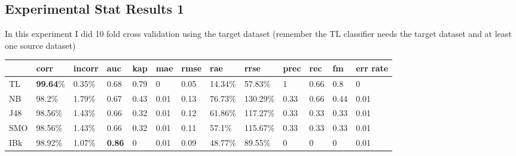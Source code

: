 \documentclass[a4paper,12pt, english]{article}
\begin{document}
\subsection{Experimental Stat Results 1}
In this experiment I did 10 fold cross validation using the target dataset (remember the TL classifier needs the target dataset and at least one source dataset)
\begin{small}
\begin{center}
    \begin{tabular}{ | l | l | l | l | l | l | l | l | l | l | l | l | l |}
    \hline
      & corr & incorr  & auc & kap & mae & rmse & rae & rrse & prec & rec & fm & err rate\\ \hline
      TL  & \textbf{99.64}\% & 0.35\% & 0.68 & 0.79 & 0 & 0.05 & 14.34\% & 57.83\% & 1 & 0.66 & 0.8 & 0\\ \hline
      NB  & 98.2\%  & 1.79\% & 0.67 & 0.43 & 0.01 & 0.13 & 76.73\% & 130.29\% & 0.33 & 0.66 & 0.44 & 0.01\\ \hline
      J48 & 98.56\% & 1.43\% & 0.66 & 0.32 & 0.01 & 0.12 & 61.86\% & 117.27\% & 0.33 & 0.33 & 0.33 & 0.01\\ \hline
      SMO & 98.56\% & 1.43\% & 0.66 & 0.32 & 0.01 & 0.11 & 57.1\% & 115.67\% & 0.33 & 0.33 & 0.33 & 0.01\\ \hline
      IBk & 98.92\% & 1.07\% & \textbf{0.86} & 0 & 0.01 & 0.09 & 48.77\% & 89.55\% & 0 & 0 & 0 & 0.01\\ \hline

    
    
    \end{tabular}       
\end{center}
\end{small}
\end{document}
